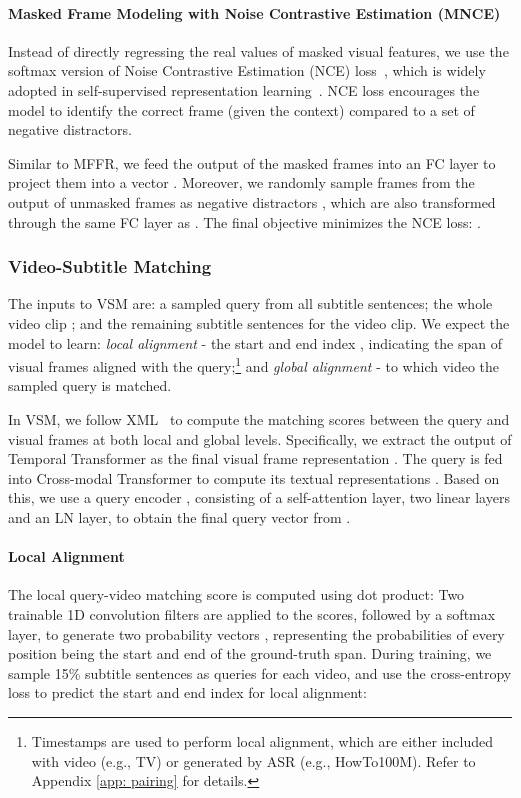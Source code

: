 \documentclass[11pt,a4paper]{article}
\begin{document}
\vspace{5pt}
\paragraph{Masked Frame Modeling with Noise Contrastive Estimation (MNCE)}
Instead of directly regressing the real values of masked visual features, we use the softmax version of Noise Contrastive Estimation (NCE) loss~\cite{jozefowicz2016exploring}, which is widely adopted in self-supervised representation learning~\citep{sun2019contrastive,hjelm2018learning,oord2018representation}. NCE loss encourages the model to identify the correct frame (given the context) compared to a set of negative distractors.

Similar to MFFR, we feed the output of the masked frames  into an FC layer to project them into a vector . Moreover, we randomly sample frames from the output of unmasked frames as negative distractors , which are also transformed through the same FC layer as . The final objective minimizes the NCE loss: 
.

\vspace{5pt}
\subsubsection{Video-Subtitle Matching} 
The inputs to VSM are:  a sampled query  from all subtitle sentences;  the whole video clip ; and  the remaining subtitle sentences  for the video clip. We expect the model to learn:  \emph{local alignment} - the start and end index , indicating the span of visual frames aligned with the query;\footnote{
Timestamps are used to perform local alignment, which are either included with video (e.g., TV) or generated by ASR (e.g., HowTo100M). Refer to Appendix \ref{app: pairing} for details.} and  \emph{global alignment} - to which video the sampled query is matched.

In VSM, we follow XML~\citep{lei2020tvr} to compute the matching scores between the query and visual frames at both local and global levels. Specifically, we extract the output of Temporal Transformer as the final visual frame representation . The query is fed into Cross-modal Transformer to compute its textual representations . Based on this, we use a query encoder \citep{lei2020tvr}, consisting of a self-attention layer, two linear layers and an LN layer, to obtain the final query vector  from .

\paragraph{Local Alignment}
The local query-video matching score is computed using dot product: 
Two trainable 1D convolution filters are applied to the scores, followed by a softmax layer, to generate two probability vectors , representing the probabilities of every position being the start and
end of the ground-truth span.
During training, we sample 15\% subtitle sentences as queries for each video, and use the cross-entropy loss to predict the start and end index for local alignment: 
\end{document}
